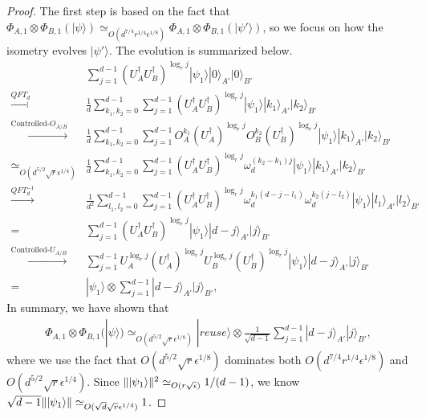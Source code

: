 \documentclass[11pt,letterpaper]{article}
\newcommand{\ket}[1]{|#1\rangle}
\newcommand{\x}{\otimes}
\newcommand{\ct}{^{\dagger}}
\DeclarePairedDelimiter{\norm}{\lVert}{\rVert}
\newcommand{\1}{\mathbb{1}}
\newcommand{\ep}{\epsilon}
\newcommand{\se}{\sqrt{\epsilon}}
\newcommand{\qe}{\epsilon^{1/4}}
\newcommand{\sd}{\sqrt{d}}
\newcommand{\sr}{\sqrt{r}}
\newcommand{\appd}[1]{\simeq_{#1}}
\theoremstyle{definition}
\begin{document}
\begin{proof}
The first step is based on the fact that $ \Phi_{A,1} \x \Phi_{B,1} (\ket{\psi}) \appd{O(d^{7/4} r^{1/4} \ep^{1/8})}  \Phi_{A,1} \x \Phi_{B,1} (\ket{\psi'})$,  
so we focus on how the isometry evolves $\ket{\psi'}$.
The evolution is summarized below.
	\begin{align}
		& \sum_{j=1}^{d-1} (U_A\ct U_B\ct)^{\log_r j} \ket{\psi_1} \ket{0}_{A'}\ket{0}_{B'}\\
		\xrightarrow[]{QFT_d}& \frac{1}{d}\sum_{k_1,k_2 = 0}^{d-1} \sum_{j=1}^{d-1} (U_A\ct U_B\ct)^{\log_r j}  \ket{\psi_1}\ket{k_1}_{A'}\ket{k_2}_{B'}\\
		\xrightarrow[]{\text{Controlled-}O_{A/B}}& \frac{1}{d}\sum_{k_1,k_2 = 0}^{d-1} \sum_{j=1}^{d-1} O_A^{k_1}(U_A\ct)^{\log_r j} O_B^{k_2}(U_B\ct)^{\log_r j}
		\ket{\psi_1} \ket{k_1}_{A'}\ket{k_2}_{B'}\\
		\appd{O(d^{5/2} \sr \qe)}&\frac{1}{d} \sum_{k_1,k_2 = 0}^{d-1} \sum_{j=1}^{d-1} (U_A\ct U_B\ct)^{\log_r j}\omega_d^{(k_2-k_1)j}\ket{\psi_1} \ket{k_1}_{A'}\ket{k_2}_{B'}\\
		\xrightarrow[]{QFT_d^{-1}} &\frac{1}{d^2}\sum_{l_1,l_2 = 0}^{d-1}\sum_{j=1}^{d-1} (U_A\ct U_B\ct)^{\log_r j} 
		\omega_d^{k_1(d-j-l_1)}\omega_d^{k_2(j-l_2)}\ket{\psi_1} \ket{l_1}_{A'}\ket{l_2}_{B'}\\
		= &\sum_{j=1}^{d-1}(U_A\ct U_B\ct)^{\log_r j} \ket{\psi_1} \ket{d-j}_{A'}\ket{j}_{B'} \\
		\xrightarrow[]{\text{Controlled-}U_{A/B}}& \sum_{j=1}^{d-1} U_A^{\log_r j} (U_A\ct)^{\log_r j} U_B^{\log_r j} (U_B\ct)^{\log_r j} \ket{\psi_1} \ket{d-j}_{A'}\ket{j}_{B'}\\
		=&\ket{\psi_1} \x \sum_{j=1}^{d-1} \ket{d-j}_{A'}\ket{j}_{B'},
	\end{align}
In summary, we have shown that
\begin{align}
	\Phi_{A,1}\x\Phi_{B,1}(\ket{\psi}) \appd{O(d^{5/2} \sr \ep^{1/8})} \ket{reuse} \x \frac{1}{\sqrt{d-1}}\sum_{j=1}^{d-1} \ket{d-j}_{A'}\ket{j}_{B'},
\end{align}
where we use the fact that $O(d^{5/2} \sr \ep^{1/8})$ dominates both $O(d^{7/4} r^{1/4} \ep^{1/8})$ and 
$O(d^{5/2} \sr \qe)$.
Since $\norm{\ket{\psi_1}}^2 \appd{O(r \se)} 1/(d-1)$, we know $ \sqrt{d-1} \norm{\ket{\psi_1}} \appd{O(\sd \sr\qe)} 1$.


\end{proof}
\end{document}

